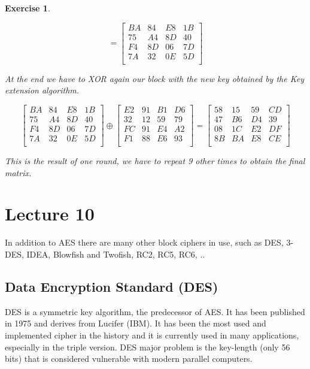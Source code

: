 \documentclass[a4paper, 12pt]{report}
\newtheorem{exercise}{\textbf{Exercise}}
\begin{document}
\begin{exercise}
\begin{center}
\[		=
		\left[ \begin{array}{cccc}
		BA & 84 & E8 & 1B \\
		75 & A4 & 8D & 40 \\
		F4 & 8D & 06 & 7D \\
		7A & 32 & 0E & 5D \\
		\end{array} \right]
		\]
	\end{center}
	At the end we have to XOR again our block with the new key obtained by the Key extension algorithm.
	\begin{center}	
		\[ 
		\left[ \begin{array}{cccc}
		BA & 84 & E8 & 1B \\
		75 & A4 & 8D & 40 \\
		F4 & 8D & 06 & 7D \\
		7A & 32 & 0E & 5D \\
		\end{array} \right]
		\oplus		
		\left[ \begin{array}{cccc}
		E2 & 91 & B1 & D6 \\
		32 & 12 & 59 & 79 \\
		FC & 91 & E4 & A2 \\
		F1 & 88 & E6 & 93 \\
		\end{array} \right]		
		=
		\left[ \begin{array}{cccc}
		58 & 15 & 59 & CD \\
		47 & B6 & D4 & 39 \\
		08 & 1C & E2 & DF \\
		8B & BA & E8 & CE \\
		\end{array} \right]
		\]
	\end{center}

	This is the result of one round, we have to repeat 9 other times to obtain the final matrix.
\end{exercise}

\chapter*{Lecture 10}
In addition to AES there are many other block ciphers in use, such as DES, 3-DES, IDEA, Blowfish and Twofish, RC2, RC5, RC6, ..

\section*{Data Encryption Standard (DES)}
DES is a symmetric key algorithm, the predecessor of AES. It has been published in 1975 and derives from Lucifer (IBM). It has been the most used and implemented cipher in the history and it is currently used in many applications, especially in the triple version. DES major problem is the key-length (only 56 bits) that is considered vulnerable with modern parallel computers.
\end{document}
